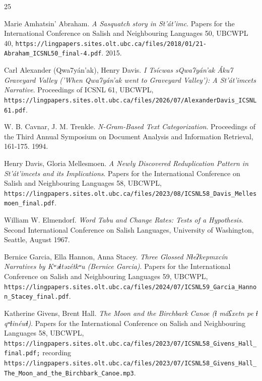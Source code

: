 \backmatter
{}
\begin{thebibliography}{25}

Marie Amhatsin' Abraham. \emph{A Sasquatch story in St'át'imc}. Papers for the International Conference on Salish and Neighbouring Languages 50, UBCWPL 40, \texttt{https:/\allowbreak{}/\allowbreak{}lingpapers.sites.olt.ubc.ca/\allowbreak{}files/\allowbreak{}2018/\allowbreak{}01/\allowbreak{}21-Abraham\_\allowbreak{}ICSNL50\_\allowbreak{}final-4.pdf}. 2015.

Carl Alexander (Qwa7yán'ak), Henry Davis. \emph{I Tsícwas sQwa7yán'ak Áku7 Graveyard Valley ('When Qwa7yán'ak went to Graveyard Valley'): A St'át'imcets Narrative}. Proceedings of ICSNL 61, UBCWPL, \texttt{https:/\allowbreak{}/\allowbreak{}lingpapers.sites.olt.ubc.ca/\allowbreak{}files/\allowbreak{}2026/\allowbreak{}07/\allowbreak{}AlexanderDavis\_\allowbreak{}ICSNL61.pdf}.

W. B. Cavnar, J. M. Trenkle. \emph{N-Gram-Based Text Categorization}. Proceedings of the Third Annual Symposium on Document Analysis and Information Retrieval, 161-175. 1994.

Henry Davis, Gloria Mellesmoen. \emph{A Newly Discovered Reduplication Pattern in St'át'imcets and its Implications}. Papers for the International Conference on Salish and Neighbouring Languages 58, UBCWPL, \texttt{https:/\allowbreak{}/\allowbreak{}lingpapers.sites.olt.ubc.ca/\allowbreak{}files/\allowbreak{}2023/\allowbreak{}08/\allowbreak{}ICSNL58\_\allowbreak{}Davis\_\allowbreak{}Mellesmoen\_\allowbreak{}final.pdf}.

William W. Elmendorf. \emph{Word Tabu and Change Rates: Tests of a Hypothesis}. Second International Conference on Salish Languages, University of Washington, Seattle, August 1967.

Bernice Garcia, Ella Hannon, Anna Stacey. \emph{Three Glossed Nɬeʔkepmxcín Narratives by Kʷəɬtəzétkʷu (Bernice Garcia)}. Papers for the International Conference on Salish and Neighbouring Languages 59, UBCWPL, \texttt{https:/\allowbreak{}/\allowbreak{}lingpapers.sites.olt.ubc.ca/\allowbreak{}files/\allowbreak{}2024/\allowbreak{}07/\allowbreak{}ICSNL59\_\allowbreak{}Garcia\_\allowbreak{}Hannon\_\allowbreak{}Stacey\_\allowbreak{}final.pdf}.

Katherine Givens, Brent Hall. \emph{The Moon and the Birchbark Canoe (ɬ máʕxetn pe ɬ qʷɬinéwɬ)}. Papers for the International Conference on Salish and Neighbouring Languages 58, UBCWPL, \texttt{https:/\allowbreak{}/\allowbreak{}lingpapers.sites.olt.ubc.ca/\allowbreak{}files/\allowbreak{}2023/\allowbreak{}07/\allowbreak{}ICSNL58\_\allowbreak{}Givens\_\allowbreak{}Hall\_\allowbreak{}final.pdf;} recording \texttt{https:/\allowbreak{}/\allowbreak{}lingpapers.sites.olt.ubc.ca/\allowbreak{}files/\allowbreak{}2023/\allowbreak{}07/\allowbreak{}ICSNL58\_\allowbreak{}Givens\_\allowbreak{}Hall\_\allowbreak{}The\_\allowbreak{}Moon\_\allowbreak{}and\_\allowbreak{}the\_\allowbreak{}Birchbark\_\allowbreak{}Canoe.mp3}.


\end{thebibliography}
